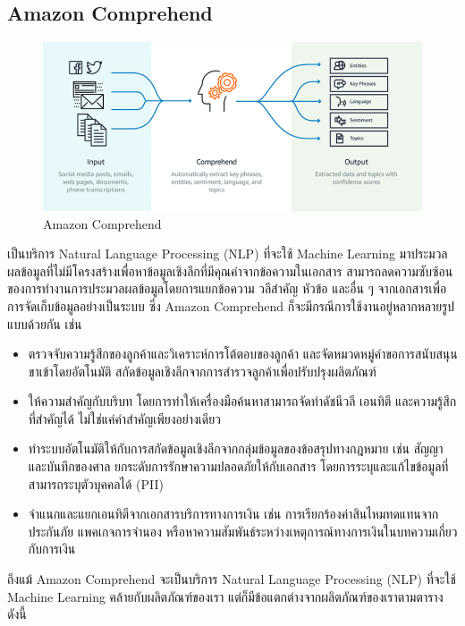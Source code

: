 \documentclass[12pt,oneside,openright,a4paper]{cpe-thai-project}
\begin{document}
  \subsection{Amazon Comprehend}
  \begin{figure}[!ht]\centering
  \includegraphics[width=13cm]{./img/aws.png}
  \caption{Amazon Comprehend}\label{fig:aws}
  \end{figure}
  \hspace{1cm}เป็นบริการ Natural Language Processing (NLP) ที่จะใช้ Machine Learning มาประมวลผลข้อมูลที่ไม่มีโครงสร้างเพื่อหาข้อมูลเชิงลึกที่มีคุณค่าจากข้อความในเอกสาร 
  สามารถลดความซับซ้อนของการทำงานการประมวลผลข้อมูลโดยการแยกข้อความ วลีสำคัญ หัวข้อ และอื่น ๆ จากเอกสารเพื่อการจัดเก็บข้อมูลอย่างเป็นระบบ
  ซึ่ง Amazon Comprehend ก็จะมีกรณีการใช้งานอยู่หลากหลายรูปแบบด้วยกัน \cite{aws} เช่น
  \begin{itemize}
    \item ตรวจจับความรู้สึกของลูกค้าและวิเคราะห์การโต้ตอบของลูกค้า และจัดหมวดหมู่คำขอการสนับสนุนขาเข้าโดยอัตโนมัติ สกัดข้อมูลเชิงลึกจากการสำรวจลูกค้าเพื่อปรับปรุงผลิตภัณฑ์
    \item ให้ความสำคัญกับบริบท โดยการทำให้เครื่องมือค้นหาสามารถจัดทำดัชนีวลี เอนทิตี และความรู้สึกที่สำคัญได้ ไม่ใช่แค่คำสำคัญเพียงอย่างเดียว
    \item ทำระบบอัตโนมัติให้กับการสกัดข้อมูลเชิงลึกจากกลุ่มข้อมูลของข้อสรุปทางกฎหมาย เช่น สัญญาและบันทึกของศาล ยกระดับการรักษาความปลอดภัยให้กับเอกสาร โดยการระบุและแก้ไขข้อมูลที่สามารถระบุตัวบุคคลได้ (PII)
    \item จำแนกและแยกเอนทิตีจากเอกสารบริการทางการเงิน เช่น การเรียกร้องค่าสินไหมทดแทนจากประกันภัย แพคเกจการจำนอง หรือหาความสัมพันธ์ระหว่างเหตุการณ์ทางการเงินในบทความเกี่ยวกับการเงิน 
  \end{itemize}
  \hspace{1cm}ถึงแม้ Amazon Comprehend จะเป็นบริการ Natural Language Processing (NLP) ที่จะใช้ Machine Learning คล้ายกับผลิตภัณฑ์ของเรา 
  แต่ก็มีข้อแตกต่างจากผลิตภัณฑ์ของเราตามตารางดังนี้ 
\end{document}

